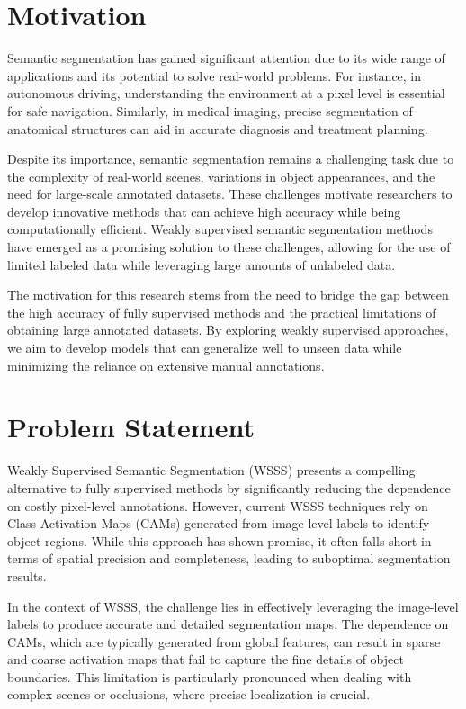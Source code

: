 \section{Motivation}
\label{sec:motivation}
Semantic segmentation has gained significant attention due to its wide range of applications and its potential to solve real-world problems. For instance, in autonomous driving, understanding the environment at a pixel level is essential for safe navigation. Similarly, in medical imaging, precise segmentation of anatomical structures can aid in accurate diagnosis and treatment planning.

Despite its importance, semantic segmentation remains a challenging task due to the complexity of real-world scenes, variations in object appearances, and the need for large-scale annotated datasets. These challenges motivate researchers to develop innovative methods that can achieve high accuracy while being computationally efficient. Weakly supervised semantic segmentation methods have emerged as a promising solution to these challenges, allowing for the use of limited labeled data while leveraging large amounts of unlabeled data.

The motivation for this research stems from the need to bridge the gap between the high accuracy of fully supervised methods and the practical limitations of obtaining large annotated datasets. By exploring weakly supervised approaches, we aim to develop models that can generalize well to unseen data while minimizing the reliance on extensive manual annotations.

\section{Problem Statement}
\label{sec:problem_statement}

Weakly Supervised Semantic Segmentation (WSSS) presents a compelling alternative to fully supervised methods by significantly reducing the dependence on costly pixel-level annotations. However, current WSSS techniques rely on Class Activation Maps (CAMs) \cite{cam} generated from image-level labels to identify object regions. While this approach has shown promise, it often falls short in terms of spatial precision and completeness, leading to suboptimal segmentation results.

In the context of WSSS, the challenge lies in effectively leveraging the image-level labels to produce accurate and detailed segmentation maps. The dependence on CAMs, which are typically generated from global features, can result in sparse and coarse activation maps that fail to capture the fine details of object boundaries. This limitation is particularly pronounced when dealing with complex scenes or occlusions, where precise localization is crucial.

